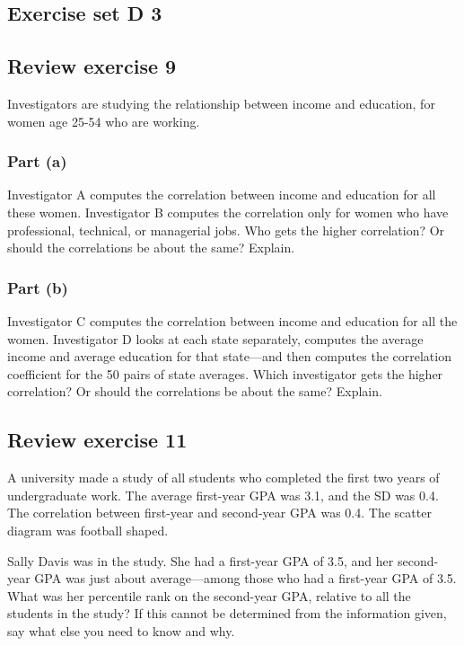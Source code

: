 \documentclass[11pt]{article}
\begin{document}
\subsection*{Exercise set D 3} %



\subsection*{Review exercise 9} %
Investigators are studying the relationship between income and education, for women age 25-54 who are working.
\subsubsection*{Part (a)}
Investigator A computes the correlation between income and education for all these women.
Investigator B computes the correlation only for women who have professional, technical, or managerial jobs.
Who gets the higher correlation?
Or should the correlations be about the same?
Explain.

\subsubsection*{Part (b)}
Investigator C computes the correlation between income and education for all the women.
Investigator D looks at each state separately, computes the average income and average education for that state---and then computes the correlation coefficient for the 50 pairs of state averages.
Which investigator gets the higher correlation?
Or should the correlations be about the same?
Explain.

\subsection*{Review exercise 11} %
A university made a study of all students who completed the first two years of undergraduate work.
The average first-year GPA was 3.1, and the SD was 0.4.
The correlation between first-year and second-year GPA was 0.4.
The scatter diagram was football shaped.

Sally Davis was in the study.
She had a first-year GPA of 3.5, and her second-year GPA was just about average---among those who had a first-year GPA of 3.5.
What was her percentile rank on the second-year GPA, relative to all the students in the study?
If this cannot be determined from the information given, say what else you need to know and why.
\end{document}
